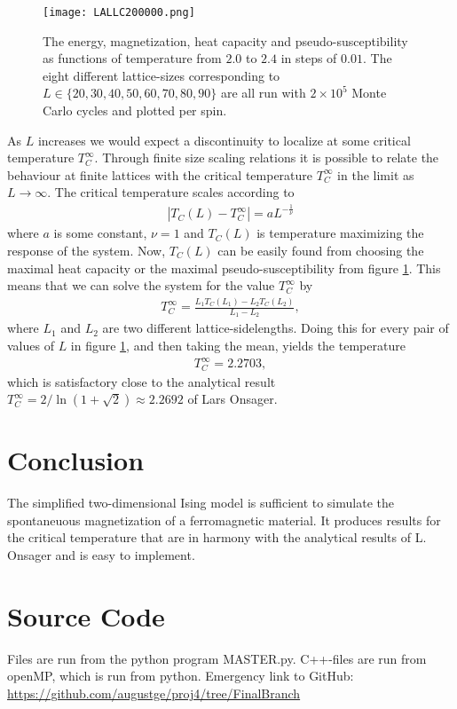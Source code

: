 \documentclass[twoside,utf8]{article}
\newcommand{\EQU}[1] { \begin{equation*} \begin{split} #1 \end{split} \end{equation*} }
\newcommand{\EQUn}[1] { \begin{equation} \begin{split} #1 \end{split} \end{equation} }
\begin{document}
\begin{figure}[H]
\begin{center}
\texttt{[image: LALLC200000.png]}
\end{center}
\caption{
The energy, magnetization, heat capacity and pseudo-susceptibility as functions of temperature from $2.0$ to $2.4$ in steps of $0.01$. The eight different lattice-sizes corresponding to $L\in \{20,30,40,50,60,70,80,90\}$ are all run with $2\times 10^5$ Monte Carlo cycles and plotted per spin. 
}
\label{EMCX}
\end{figure}

As $L$ increases we would expect a discontinuity to localize at some critical temperature $T_C^\infty$. Through finite size scaling relations it is possible to relate the behaviour at finite lattices with the critical temperature $T_C^\infty$ in the limit as $L\rightarrow \infty$. The critical temperature scales according to
\EQUn{
|T_C(L)-T_C^\infty|=aL^{-\frac{1}{\nu}}
}
where $a$ is some constant, $\nu=1$ and $T_C(L)$ is temperature maximizing the response of the system. Now, $T_C(L)$ can be easily found from choosing the maximal heat capacity or the maximal pseudo-susceptibility from figure \ref*{EMCX}. This means that we can solve the system for the value $T_C^\infty$ by
\EQU{
T_C^\infty = \frac{L_1 T_C(L_1)-L_2 T_C(L_2)}{L_1-L_2},
} 
where $L_1$ and $L_2$ are two different lattice-sidelengths. Doing this for every pair of values of $L$ in figure \ref*{EMCX}, and then taking the mean, yields the temperature
\EQU{
T_C^\infty = 2.2703,
}
which is satisfactory close to the analytical result $T_C^\infty=2/\ln(1+\sqrt{2})\approx 2.2692$ of Lars Onsager. 


\section{Conclusion}
The simplified two-dimensional Ising model is sufficient to simulate the spontaneuous magnetization of a ferromagnetic material. It produces results for the critical temperature that are in harmony with the analytical results of L. Onsager and is easy to implement. 




\section{Source Code}
Files are run from the python program MASTER.py. C++-files are run from openMP, which is run from python. Emergency link to GitHub: \url{https://github.com/augustge/proj4/tree/FinalBranch}
\end{document}
